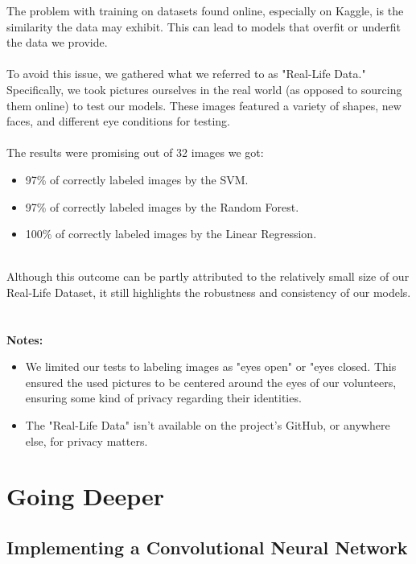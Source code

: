 \documentclass{modeleRapport}
\begin{document}
The problem with training on datasets found online, especially on Kaggle, is the similarity the data may exhibit. This can lead to models that overfit or underfit the data we provide.\\\\
To avoid this issue, we gathered what we referred to as "Real-Life Data." Specifically, we took pictures ourselves in the real world (as opposed to sourcing them online) to test our models. These images featured a variety of shapes, new faces, and different eye conditions for testing.
\\\\

The results were promising out of 32 images we got:
\begin{itemize}
    \item 97\% of correctly labeled images by the SVM.
    \item 97\% of correctly labeled images by the Random Forest.
    \item 100\% of correctly labeled images by the Linear Regression.\\\\
\end{itemize}

Although this outcome can be partly attributed to the relatively small size of our Real-Life Dataset, it still highlights the robustness and consistency of our models.
\\\\\\
\textbf{Notes:}
\begin{itemize}
    \item We limited our tests to labeling images as "eyes open" or "eyes closed. This ensured the used pictures to be centered around the eyes of our volunteers, ensuring some kind of privacy regarding their identities.
    \item The "Real-Life Data" isn't available on the project's GitHub, or anywhere else, for privacy matters.
\end{itemize} 


\newpage

\section{Going Deeper}

\subsection{Implementing a Convolutional Neural Network}
\end{document}
